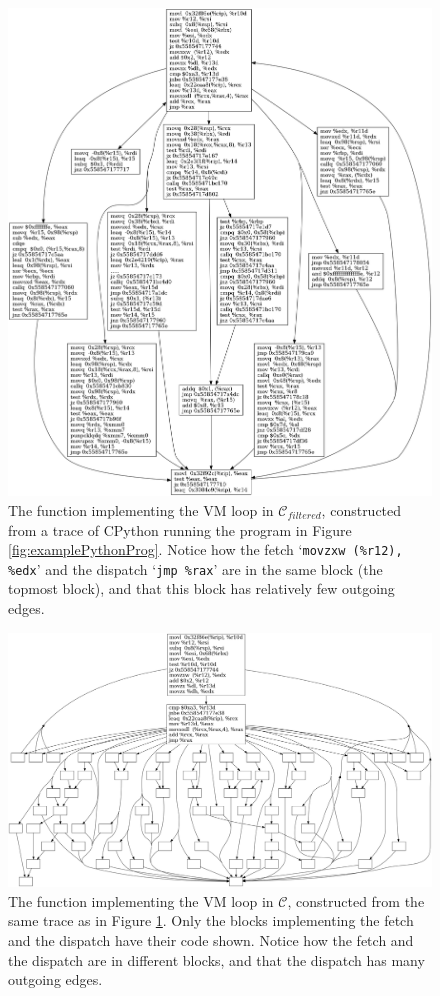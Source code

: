 \documentclass[english]{article}
\begin{document}
\begin{figure}[htp]
	\centering 	
	\includegraphics[width=\linewidth]{img/ConcreteVMFiltered.png}
	\caption{The function implementing the VM loop in $\mathcal{C}_{filtered}$, constructed from a trace of CPython running the program in Figure \ref{fig:examplePythonProg}. Notice how the fetch `\texttt{movzxw (\%r12), \%edx}' and the dispatch `\texttt{jmp \%rax}' are in the same block (the topmost block), and that this block has relatively few outgoing edges.}
	\label{fig:concreteVMFiltered}
\end{figure}

\begin{figure}[htp]
	\centering 	
	\includegraphics[width=\linewidth]{img/ConcreteVMOriginal.png}
	\caption{The function implementing the VM loop in $\mathcal{C}$, constructed from the same trace as in Figure \ref{fig:concreteVMFiltered}. Only the blocks implementing the fetch and the dispatch have their code shown. Notice how the fetch and the dispatch are in different blocks, and that the dispatch has many outgoing edges.}
	\label{fig:concreteVMOriginal}
\end{figure}
\end{document}
